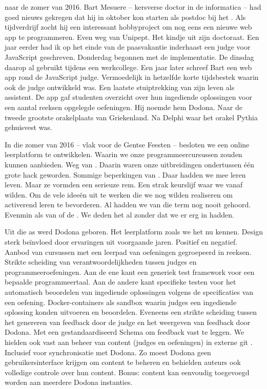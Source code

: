  naar de zomer van 2016.
Bart Mesuere -- kersverse doctor in de informatica -- had goed nieuws gekregen dat hij in oktober kon starten als postdoc bij het .
Als tijdverdrijf zocht hij een interessant hobbyproject om nog eens een nieuwe web app te programmeren.
Even weg van Unipept.
Het kindje uit zijn doctoraat.
Een jaar eerder had ik op het einde van de paasvakantie inderhaast een  judge voor JavaScript geschreven.
Donderdag begonnen met de implementatie.
De dinsdag daarop al gebruikt tijdens een werkcollege.
Een jaar later schreef Bart een web app rond de JavaScript judge.
Vermoedelijk in hetzelfde korte tijdsbestek waarin ook de judge ontwikkeld was.
Een laatste stuiptrekking van zijn leven als assistent.
De app gaf studenten overzicht over hun ingediende oplossingen voor een aantal reeksen opgelegde oefeningen.
Hij noemde hem Dodona.
Naar de tweede grootste orakelplaats van Griekenland.
Na Delphi waar het orakel Pythia gehuisvest was.

In die zomer van 2016 -- vlak voor de Gentse Feesten -- besloten we een online leerplatform te ontwikkelen.
Waarin we onze programmeercursussen zouden kunnen aanbieden.
Weg van .
Daarin waren onze uitbreidingen ondertussen één grote hack geworden.
Sommige beperkingen van .
Daar hadden we mee leren leven.
Maar ze vormden een serieuze rem.
Een strak keurslijf waar we vanaf wilden.
Om de vele ideeën uit te werken die we nog wilden realiseren om activerend leren te bevorderen.
Al hadden we van die term nog nooit gehoord.
Evenmin als van  of de .
We deden het al zonder dat we er erg in hadden.

Uit die as werd Dodona geboren.
Het leerplatform zoals we het nu kennen.
Design sterk beïnvloed door ervaringen uit voorgaande jaren.
Positief en negatief.
Aanbod van cursussen met een leerpad van oefeningen gegroepeerd in reeksen.
Strikte scheiding van verantwoordelijkheden tussen judges en programmeeroefeningen.
Aan de ene kant een generiek test framework voor een bepaalde programmeertaal.
Aan de andere kant specifieke testen voor het automatisch beoordelen van ingediende oplossingen volgens de specificaties van een oefening. 
Docker-containers als sandbox waarin judges een ingediende oplossing konden uitvoeren en beoordelen.
Eveneens een strikte scheiding tussen het genereren van feedback door de judge en het weergeven van feedback door Dodona.
Met een gestandaardiseerd  Schema om feedback vast te leggen.
We hielden ook vast aan beheer van content (judges en oefeningen) in externe git .
Inclusief  voor synchronisatie met Dodona.
Zo moest Dodona geen gebruikersinterface krijgen om content te beheren en behielden auteurs ook volledige controle over hun content.
Bonus: content kan eenvoudig toegevoegd worden aan meerdere Dodona instanties.

